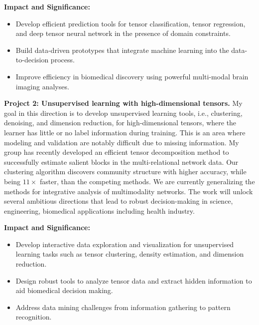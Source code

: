 \documentclass[10pt]{article}
\DeclareRobustCommand{\mybox}[2][gray!20]{%
\begin{tcolorbox}[   %
        breakable,
        left=0pt,
        right=0pt,
        top=0pt,
        bottom=0pt,
        colback=#1,
        colframe=#1,
        width=\dimexpr\textwidth\relax, 
        enlarge left by=0mm,
        boxsep=5pt,
        arc=0pt,outer arc=0pt,
        ]
        #2
\end{tcolorbox}
}
\theoremstyle{plain}
\theoremstyle{definition}
\begin{document}
\mybox[gray!20]{{\bf Impact and Significance:} 
\begin{itemize}[leftmargin=*]
\item Develop efficient prediction tools for tensor classification, tensor regression, and deep tensor neural network in the presence of domain constraints.
\item Build data-driven prototypes that integrate machine learning into the data-to-decision process. 
\item Improve efficiency in biomedical discovery using powerful multi-modal brain imaging analyses. 
\end{itemize}
}

{\bf Project 2: Unsupervised learning with high-dimensional tensors.} My goal in this direction is to develop unsupervised learning tools, i.e., clustering, denoising, and dimension reduction, for high-dimensional tensors, where the learner has little or no label information during training. This is an area where modeling and validation are notably difficult due to missing information. My group has recently developed an efficient tensor decomposition method to successfully estimate salient blocks in the multi-relational network data. Our clustering algorithm discovers community structure with higher accuracy, while being $11\times$ faster, than the competing methods. We are currently generalizing the methods for integrative analysis of multimodality networks. The work will unlock several ambitious directions that lead to robust decision-making in science, engineering, biomedical applications including health industry.  

\mybox[gray!20]{
{\bf Impact and Significance:} 
\begin{itemize}[leftmargin=*]
\item Develop interactive data exploration and visualization for unsupervised learning tasks such as tensor clustering, density estimation, and dimension reduction. 
\item Design robust tools to analyze tensor data and extract hidden information to aid biomedical decision making. 
\item Address data mining challenges from information gathering to pattern recognition. 
\end{itemize}
 }
\end{document}
